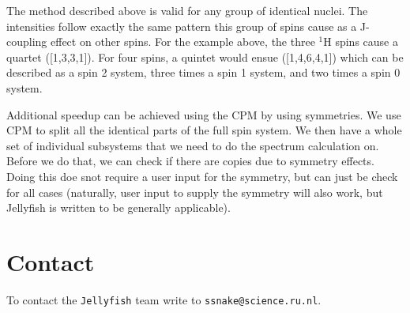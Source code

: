 \documentclass[11pt,a4paper]{article}
\begin{document}
The method described above is valid for any group of identical nuclei. The intensities
follow exactly the same pattern this group of spins cause as a J-coupling effect on other
spins. For the example above, the three $^1$H spins cause a quartet ([1,3,3,1]). For four
spins, a quintet would ensue ([1,4,6,4,1]) which can be described as a spin 2 system,
three times a spin 1 system, and two times a spin 0 system.

Additional speedup can be achieved using the CPM by using symmetries. We use CPM to split
all the identical parts of the full spin system. We then have a whole set of individual
subsystems that we need to do the spectrum calculation on. Before we do that, we can
check if there are copies due to symmetry effects. Doing this doe snot require a user
input for the symmetry, but can just be check for all cases (naturally, user input to
supply the symmetry will also work, but Jellyfish is written to be generally applicable).



\section{Contact}
To contact the \texttt{Jellyfish} team write to \texttt{ssnake@science.ru.nl}.
%
%
\end{document}

